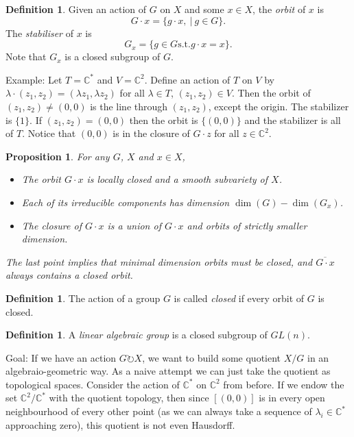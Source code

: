 \documentclass{article}
\newtheorem{prop}[theorem]{Proposition}
\theoremstyle{definition}
\newtheorem{definition}[theorem]{Definition}
\theoremstyle{remark}
\numberwithin{theorem}{section}
\newcommand{\C}{\mathbb{C}}
\newenvironment{defn}{
	\begin{mdframed}
		\vspace{-0.5em}
		\begin{definition}
		}{
		\end{definition}
	\end{mdframed}
}
\begin{document}
\begin{defn}
	Given an action of $G$ on $X$ and some $x\in X$, the \emph{orbit} of $x$ is
	\begin{equation}
		G\cdot x = \{g\cdot x, ~|~g\in G\}.
	\end{equation}
	The \emph{stabiliser} of $x$ is 
	\begin{equation}
		G_x = \{g\in G \text{s.t.} g\cdot x = x\}.
	\end{equation}
	Note that $G_x$ is a closed subgroup of $G$. 
\end{defn}
Example: Let $T=\C^\ast$ and $V=\C^2$. Define an action of $T$ on $V$ by $\lambda\cdot(z_1,z_2) = (\lambda z_1, \lambda z_2)$ for all $\lambda \in T$, $(z_1,z_2)\in V$. Then the orbit of $(z_1,z_2)\neq(0,0)$ is the line through $(z_1,z_2)$, except the origin. The stabilizer is $\{1\}$. If $(z_1,z_2)=(0,0)$ then the orbit is $\{(0,0)\}$ and the stabilizer is all of $T$. Notice that $(0,0)$ is in the closure of $G\cdot z$ for all $z\in \C^2$. 
\begin{prop}
	For any $G$, $X$ and $x\in X$, 
	\begin{itemize}
		\item The orbit $G\cdot x$ is locally closed and a smooth subvariety of $X$.
		\item Each of its irreducible components has dimension $\dim(G)-\dim(G_x)$.
		\item The closure of $G\cdot x$ is a union of $G\cdot x$ and orbits of strictly smaller dimension.
	\end{itemize}
	The last point implies that minimal dimension orbits must be closed, and $\overline{G\cdot x}$ always contains a closed orbit.
\end{prop}
\begin{defn}
	The action of a group $G$ is called \emph{closed} if every orbit of $G$ is closed.
\end{defn}
\begin{defn}
	A \emph{linear algebraic group} is a closed subgroup of $GL(n)$.
\end{defn}
Goal: If we have an action $G\circlearrowright X$, we want to build some quotient $X/G$ in an algebraio-geometric way. As a naive attempt we can just take the quotient as topological spaces. Consider the action of $\C^\ast$ on $\C^2$ from before. If we endow the set $\C^2/\C^\ast$ with the quotient topology, then since $[(0,0)]$ is in every open neighbourhood of every other point (as we can always take a sequence of $\lambda_i\in\C^\ast$ approaching zero), this quotient is not even Hausdorff. \vspace{1em}
\end{document}
